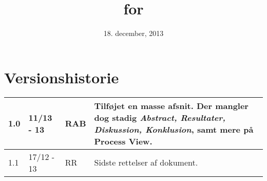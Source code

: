 \documentclass[oneside, 12pt]{memoir}
\title{\DocumentType \\ for \\ \ProjectName}
\date{18. december, 2013}
\begin{document}
\begin{titlingpage}
	
\end{titlingpage}


\section*{Versionshistorie}
\begin{tabular}{p{}|p{}|p{}|p{}}
\hline 1.0 & 11/13 - 13 & RAB & Tilføjet en masse afsnit. Der mangler dog stadig \textit{Abstract,  Resultater, Diskussion, Konklusion}, samt mere på Process View. 
\\ \hline 
1.1 & 17/12 - 13 & RR & Sidste rettelser af dokument.
\\ \hline 
\end{tabular} 





\newpage
\tableofcontents* %
\newpage
\listoffigures* %

\listoffixmes




\newpage

\newpage

\newpage

\newpage

\newpage

\newpage

\newpage

\newpage

\newpage

\newpage





\newpage
\appendix



\end{document}
